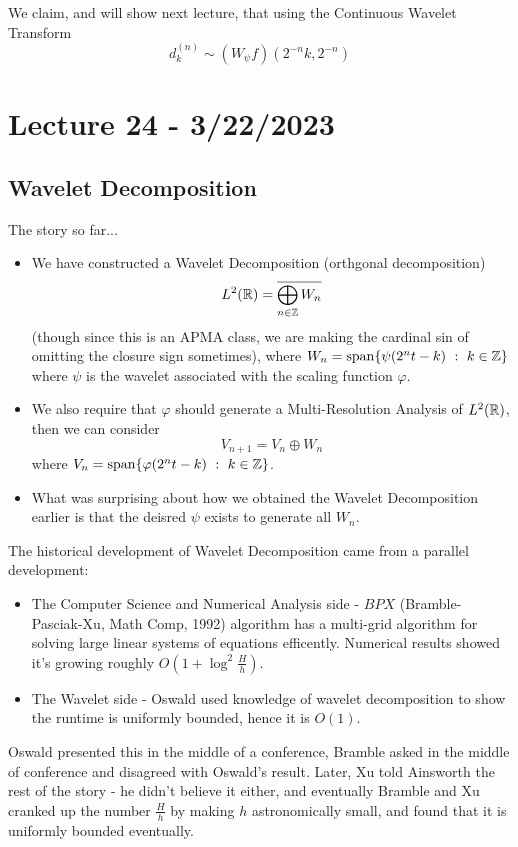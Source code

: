 \documentclass{article}
\begin{document}
We claim, and will show next lecture, that using the Continuous Wavelet Transform
\[d^{(n)}_k \sim (W_\psi f)(2^{-n} k, 2^{-n})\]

\newpage
\section{Lecture 24 - 3/22/2023}
\subsection{Wavelet Decomposition}
The story so far...
\begin{itemize}
    \item We have constructed a Wavelet Decomposition (orthgonal decomposition)
    \[L^2(\mathbb{R}) = \overline{\bigoplus_{n \in \mathbb{Z}} W_n}\]
    (though since this is an APMA class, we are making the cardinal sin of omitting the closure sign sometimes), where $W_n = \operatorname{span} \{\psi(2^n t - k)\ :\ k \in \mathbb{Z}\}$ where $\psi$ is the wavelet associated with the scaling function $\varphi$.
    \item We also require that $\varphi$ should generate a Multi-Resolution Analysis of $L^2(\mathbb{R})$, then we can consider
    \[V_{n+1} = V_n \oplus W_n\]
    where $V_n = \operatorname{span} \{\varphi(2^n t - k)\ :\ k \in \mathbb{Z}\}$.
    \item What was surprising about how we obtained the Wavelet Decomposition earlier is that the deisred $\psi$ exists to generate all $W_n$.
\end{itemize}

\begin{remark}
The historical development of Wavelet Decomposition came from a parallel development:
\begin{itemize}
    \item The Computer Science and Numerical Analysis side - $BPX$ (Bramble-Pasciak-Xu, Math Comp, 1992) algorithm has a multi-grid algorithm for solving large linear systems of equations efficently. Numerical results showed it's growing roughly $O(1 + \log^2 \frac{H}{h})$.
    \item The Wavelet side - Oswald used knowledge of wavelet decomposition to show the runtime is uniformly bounded, hence it is $O(1)$.
\end{itemize}
Oswald presented this in the middle of a conference, Bramble asked in the middle of conference and disagreed with Oswald's result. Later, Xu told Ainsworth the rest of the story - he didn't believe it either, and eventually Bramble and Xu cranked up the number $\frac{H}{h}$ by making $h$ astronomically small, and found that it is uniformly bounded eventually.
\end{remark}
\end{document}
